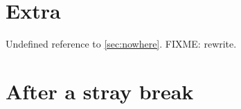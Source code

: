 \section{Extra}\label{sec:extra}
Undefined reference to \ref{sec:nowhere}. FIXME: rewrite.\\
\section{After a stray break}
